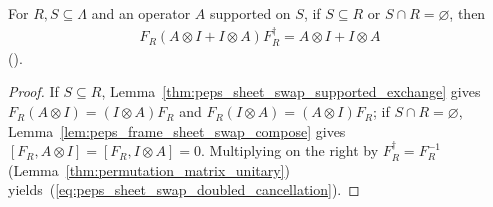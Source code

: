 \begin{lemma}
    \label{thm:peps_sheet_swap_doubled_cancellation}
    \leanok
    For $R,S\subseteq\Lambda$ and an operator $A$ supported on $S$, if
    $S\subseteq R$ or $S\cap R=\varnothing$, then
    \begin{align}
        F_R(A\otimes I+I\otimes A)F_R^\dagger
        =A\otimes I+I\otimes A
        \label{eq:peps_sheet_swap_doubled_cancellation}
    \end{align}
    (\cite{OpenAI2026PolynomialPEPS}).
\end{lemma}
\begin{proof}
    \leanok
    If $S\subseteq R$, Lemma~\ref{thm:peps_sheet_swap_supported_exchange}
    gives $F_R(A\otimes I)=(I\otimes A)F_R$ and $F_R(I\otimes A)=(A\otimes I)F_R$;
    if $S\cap R=\varnothing$, Lemma~\ref{lem:peps_frame_sheet_swap_compose}
    gives $[F_R,A\otimes I]=[F_R,I\otimes A]=0$. Multiplying on the right by
    $F_R^\dagger=F_R^{-1}$ (Lemma~\ref{thm:permutation_matrix_unitary})
    yields~(\ref{eq:peps_sheet_swap_doubled_cancellation}).
\end{proof}


